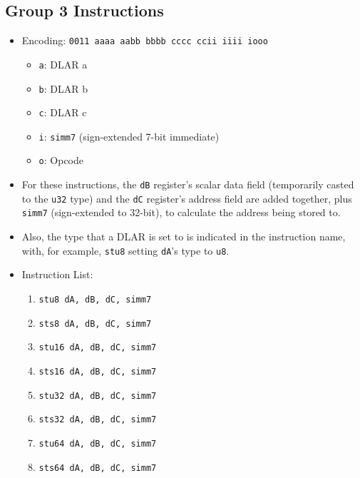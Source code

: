 \documentclass{article}
\begin{document}
	\subsection{Group 3 Instructions}
		\begin{itemize}
		\item Encoding: \texttt{0011 aaaa aabb bbbb  cccc ccii iiii iooo}
			\begin{itemize}
			\item \texttt{a}: DLAR a
			\item \texttt{b}: DLAR b
			\item \texttt{c}: DLAR c
			\item \texttt{i}: \texttt{simm7} (sign-extended 7-bit
				immediate)
			\item \texttt{o}: Opcode
			\end{itemize}
		\item For these instructions, the \texttt{dB} register's scalar
			data field (temporarily casted to the \texttt{u32} type) and
			the \texttt{dC} register's address field are added together,
			plus \texttt{simm7} (sign-extended to 32-bit), to calculate the
			address being stored to.
		\item Also, the type that a DLAR is set to is indicated in the
			instruction name, with, for example, \texttt{stu8} setting
			\texttt{dA}'s type to \texttt{u8}.
		\item Instruction List:
			\begin{enumerate}
			\item \texttt{stu8 dA, dB, dC, simm7}
			\item \texttt{sts8 dA, dB, dC, simm7}
			\item \texttt{stu16 dA, dB, dC, simm7}
			\item \texttt{sts16 dA, dB, dC, simm7}
			\item \texttt{stu32 dA, dB, dC, simm7}
			\item \texttt{sts32 dA, dB, dC, simm7}
			\item \texttt{stu64 dA, dB, dC, simm7}
			\item \texttt{sts64 dA, dB, dC, simm7}
			\end{enumerate}
		\end{itemize}
		\newpage
\end{document}
